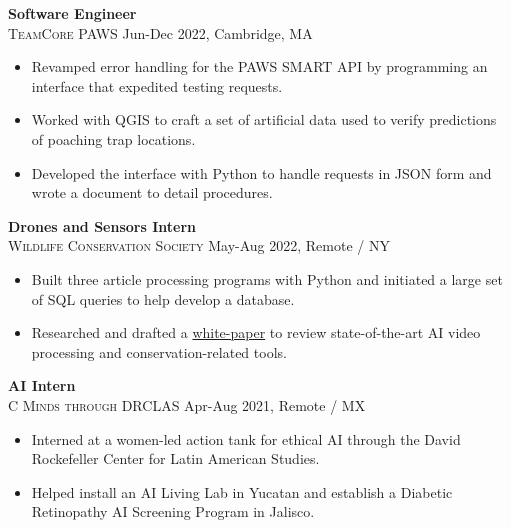 \documentclass[11pt]{article}
\begin{document}
    \noindent \textbf{Software Engineer}\\
    \textsc{{TeamCore PAWS}} \hfill Jun-Dec 2022, Cambridge, MA
    \begin{itemize}[itemsep=-.4em, leftmargin=1em]\vspace{-2mm}
      \item Revamped error handling for the PAWS SMART API by programming an interface that expedited testing requests. 
      \item Worked with QGIS to craft a set of artificial data used to verify predictions of poaching trap locations.
      \item Developed the interface with Python to handle requests in JSON form and wrote a document to detail procedures.
    \end{itemize}
    
    \noindent \textbf{Drones and Sensors Intern}\\
    \textsc{{Wildlife Conservation Society}} \hfill May-Aug 2022, Remote / NY
    \begin{itemize}[itemsep=-.4em, leftmargin=1em]\vspace{-2mm}
      \item Built three article processing programs with Python and initiated a large set of SQL queries to help develop a database.
      \item Researched and drafted a 
      \href{https://bit.ly/AI-Advancing-Video-Processing-and-CTDS}{white-paper} to review state-of-the-art AI video processing and conservation-related tools.
    \end{itemize}

    \noindent \textbf{AI Intern}\\
    \textsc{{C Minds through DRCLAS}} \hfill Apr-Aug 2021, Remote / MX
    \begin{itemize}[itemsep=-.4em, leftmargin=1em]\vspace{-2mm}
      \item Interned at a women-led action tank for ethical AI through the David Rockefeller Center for Latin American Studies.
      \item Helped install an AI Living Lab in Yucatan and establish a Diabetic Retinopathy AI Screening Program in Jalisco. 
    \end{itemize}
\end{document}

